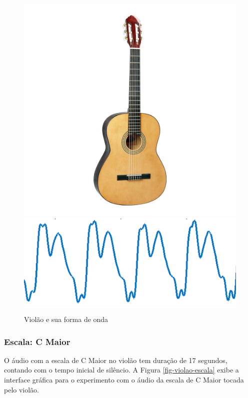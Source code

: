 \begin{figure}[h!]
	\centering
	\includegraphics[width=\linewidth/4]{pasta1_figuras/violao.jpg}
	\includegraphics[scale=0.8]{pasta1_figuras/violao-timbre.png}
	\caption{Violão e sua forma de onda}
	\label{fig-violao}
\end{figure}

\subsubsection{Escala: C Maior}

O áudio com a escala de C Maior no violão tem duração de 17 segundos, contando com o tempo inicial de silêncio. A Figura \ref{fig-violao-escala} exibe a interface gráfica para o experimento com o áudio da escala de C Maior tocada pelo violão.

